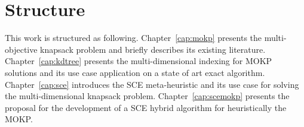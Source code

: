 \nocite{baroni2015shuffled}
\nocite{baroni2016shuffled}
\nocite{baroni2017}
\nocite{baroni2018}

\newpage
\section{Structure}
This work is structured as following.
Chapter~\ref{cap:mokp} presents the multi-objective knapsack problem
and briefly describes its existing literature.
Chapter~\ref{cap:kdtree} presents the multi-dimensional
indexing for MOKP solutions and its use case application
on a state of art exact algorithm.
Chapter~\ref{cap:sce} introduces the SCE
meta-heuristic and its use case for solving
the multi-dimensional knapsack problem.
Chapter~\ref{cap:scemokp} presents the proposal for the development
of a SCE hybrid algorithm for heuristically the MOKP.
